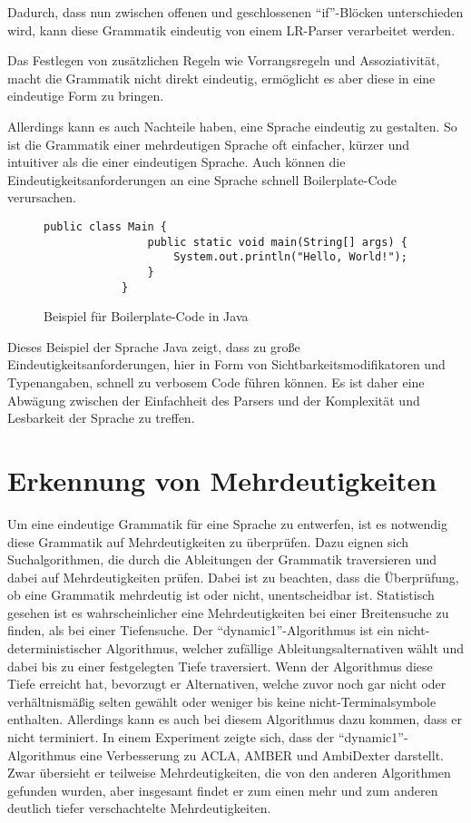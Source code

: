 \documentclass[runningheads]{llncs}
\begin{document}
	Dadurch, dass nun zwischen offenen und geschlossenen ``if''-Blöcken unterschieden wird,
	kann diese Grammatik eindeutig von einem LR-Parser verarbeitet werden.

	Das Festlegen von zusätzlichen Regeln wie Vorrangsregeln und Assoziativität,
	macht die Grammatik nicht direkt eindeutig,
	ermöglicht es aber diese in eine eindeutige Form zu bringen.

	Allerdings kann es auch Nachteile haben, eine Sprache eindeutig zu gestalten.
	So ist die Grammatik einer mehrdeutigen Sprache oft einfacher, kürzer und intuitiver als die einer eindeutigen Sprache.
	Auch können die Eindeutigkeitsanforderungen an eine Sprache schnell Boilerplate-Code verursachen.

	\begin{figure}
		\begin{lstlisting}[style=lstStyle,label={lst:lstlisting3}]
			public class Main {
			    public static void main(String[] args) {
			        System.out.println("Hello, World!");
			    }
			}
		\end{lstlisting}
		\caption{Beispiel für Boilerplate-Code in Java}
		\label{fig:figure4}
	\end{figure}

	Dieses Beispiel der Sprache Java zeigt, dass zu große Eindeutigkeitsanforderungen,
	hier in Form von Sichtbarkeitsmodifikatoren und Typenangaben, schnell zu verbosem Code führen können.
	Es ist daher eine Abwägung zwischen der Einfachheit des Parsers und der Komplexität und Lesbarkeit der Sprache zu treffen.


	\section{Erkennung von Mehrdeutigkeiten}\label{sec:erkennung-von-mehrdeutigkeiten}

	Um eine eindeutige Grammatik für eine Sprache zu entwerfen,
	ist es notwendig diese Grammatik auf Mehrdeutigkeiten zu überprüfen.
	Dazu eignen sich Suchalgorithmen, die durch die Ableitungen der Grammatik traversieren
	und dabei auf Mehrdeutigkeiten prüfen.
	Dabei ist zu beachten, dass die Überprüfung, ob eine Grammatik mehrdeutig ist oder nicht,
	unentscheidbar ist.\cite{hopcroft2006introduction}
	Statistisch gesehen ist es wahrscheinlicher eine Mehrdeutigkeiten bei einer Breitensuche zu finden,
	als bei einer Tiefensuche.\cite{springer2013}
	Der ``dynamic1''-Algorithmus\cite{springer2013} ist ein nicht-deterministischer Algorithmus,
	welcher zufällige Ableitungsalternativen wählt und dabei bis zu einer festgelegten Tiefe traversiert.
	Wenn der Algorithmus diese Tiefe erreicht hat, bevorzugt er Alternativen, welche zuvor noch gar nicht oder
	verhältnismäßig selten gewählt oder weniger bis keine nicht-Terminalsymbole enthalten.
	Allerdings kann es auch bei diesem Algorithmus dazu kommen, dass er nicht terminiert.
	In einem Experiment\cite{springer2013} zeigte sich,
	dass der ``dynamic1''-Algorithmus eine Verbesserung zu ACLA, AMBER und AmbiDexter darstellt.
	Zwar übersieht er teilweise Mehrdeutigkeiten, die von den anderen Algorithmen gefunden wurden,
	aber insgesamt findet er zum einen mehr und zum anderen deutlich tiefer verschachtelte Mehrdeutigkeiten.
\end{document}

